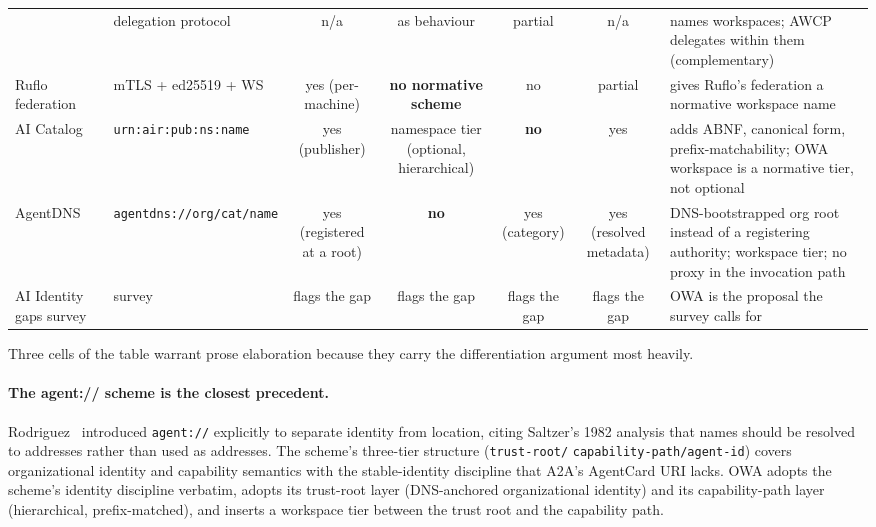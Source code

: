 \begin{table}[t]
{\begin{tabular}{p{3.2cm}p{2.4cm}cccc p{3.0cm}}
      & delegation protocol
      & n/a & as behaviour & partial & n/a
      & names workspaces; AWCP delegates within them (complementary) \\
    Ruflo federation~\cite{ruflo}
      & mTLS + ed25519 + WS
      & yes (per-machine) & \textbf{no normative scheme} & no & partial
      & gives Ruflo's federation a normative workspace name \\
    AI Catalog~\cite{ai_catalog}
      & \texttt{urn:air:pub:ns:name}
      & yes (publisher) & namespace tier (optional, hierarchical) & \textbf{no} & yes
      & adds ABNF, canonical form, prefix-matchability; OWA workspace is a normative tier, not optional \\
    AgentDNS~\cite{agentdns}
      & \texttt{agentdns://org/cat/name}
      & yes (registered at a root) & \textbf{no} & yes (category) & yes (resolved metadata)
      & DNS-bootstrapped org root instead of a registering authority; workspace tier; no proxy in the invocation path \\
    AI Identity gaps survey~\cite{ai_identity_gaps}
      & survey
      & flags the gap & flags the gap & flags the gap & flags the gap
      & OWA is the proposal the survey calls for \\
    \bottomrule
  \end{tabular}%
  }
\end{table}

Three cells of the table warrant prose elaboration because
they carry the differentiation argument most heavily.

\paragraph{The agent:// scheme is the closest precedent.}
Rodriguez~\cite{agent_uri_scheme} introduced
\texttt{agent://} explicitly to separate identity from
location, citing Saltzer's 1982 analysis that names should
be resolved to addresses rather than used as addresses. The
scheme's three-tier structure
(\texttt{trust-root/}\allowbreak
\texttt{capability-path/}\allowbreak\texttt{agent-id}) covers
organizational identity and capability semantics with the
stable-identity discipline that A2A's AgentCard URI lacks.
OWA adopts the scheme's identity discipline verbatim, adopts
its trust-root layer (DNS-anchored organizational identity)
and its capability-path layer (hierarchical, prefix-matched),
and inserts a workspace tier between the trust root and the
capability path.

